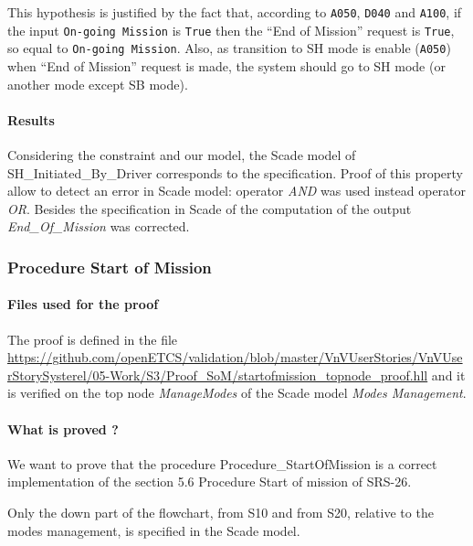 \documentclass{article}
\begin{document}
This hypothesis is justified by the fact that, according to
\texttt{A050}, \texttt{D040} and \texttt{A100}, if the input
\texttt{On-going Mission} is \texttt{True} then the ``End of Mission''
request is \texttt{True}, so equal to \texttt{On-going Mission}. Also,
as transition to SH mode is enable (\texttt{A050}) when ``End of
Mission'' request is made, the system should go to SH mode (or another
mode except SB mode). 

\paragraph{Results}
Considering the constraint and our model, the Scade model of
SH\_Initiated\_By\_Driver corresponds to the specification. Proof of this property allow to detect an error in Scade model: operator \emph{AND} was used instead operator \emph{OR}.
Besides the specification in Scade  of the computation of the output \emph{End\_Of\_Mission} was corrected.

\subsubsection{Procedure Start of Mission}

\paragraph{Files used for the proof}
The proof is defined in the file \url{https://github.com/openETCS/validation/blob/master/VnVUserStories/VnVUserStorySysterel/05-Work/S3/Proof_SoM/startofmission_topnode_proof.hll} and it is verified on the top node \emph{ManageModes} of the Scade model \emph{Modes Management}.


\paragraph{What is proved ?}
We want to prove that the procedure Procedure\_StartOfMission is a
correct implementation of the section 5.6 Procedure Start of mission of SRS-26.

Only the down part of the flowchart, from S10 and from S20, relative to the modes management, is specified in the Scade model.
\end{document}
